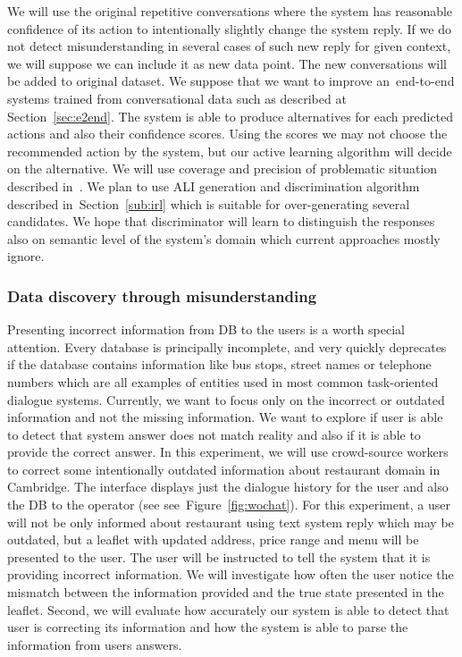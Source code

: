 \documentclass[11pt]{article}
\begin{document}
We will use the original repetitive conversations where the system has reasonable confidence of its action to intentionally slightly change the system reply.
If we do not detect misunderstanding in several cases of such new reply for given context, we will suppose we can include it as new data point. 
The new conversations will be added to original dataset.
We suppose that we want to improve an~end-to-end systems trained from conversational data such as described at Section~\ref{sec:e2end}.
The system is able to produce alternatives for each predicted actions and also their confidence scores.
Using the scores we may not choose the recommended action by the system, but our active learning algorithm will decide on the alternative.
We will use coverage and precision of problematic situation described in~\cite{meena_datadriven_2016}.
We plan to use ALI generation and discrimination algorithm described in~Section~\ref{sub:irl} which is suitable for over-generating several candidates.
We hope that discriminator will learn to distinguish the responses also on semantic level of the system's domain which current approaches mostly ignore. 

\subsubsection*{Data discovery through misunderstanding}
Presenting incorrect information from DB to the users is a worth special attention.
Every database is principally incomplete, and very quickly deprecates if the database contains information like bus stops, street names or telephone numbers which are all examples of entities used in most common task-oriented dialogue systems.
Currently, we want to focus only on the incorrect or outdated information and not the missing information.
We want to explore if user is able to detect that system answer does not match reality and also if it is able to provide the correct answer.
In this experiment, we will use crowd-source workers to correct some intentionally outdated information about restaurant domain in Cambridge.
The interface displays just the dialogue history for the user and also the DB to the operator (see see~Figure~\ref{fig:wochat}).
For this experiment, a user will not be only informed about restaurant using text system reply which may be outdated, but a leaflet with updated address, price range and menu will be presented to the user.
The user will be instructed to tell the system that it is providing incorrect information.
We will investigate how often the user notice the mismatch between the information provided and the true state presented in the leaflet.
Second, we will evaluate how accurately our system is able to detect that user is correcting its information and how the system is able to parse the information from users answers.
\end{document}
